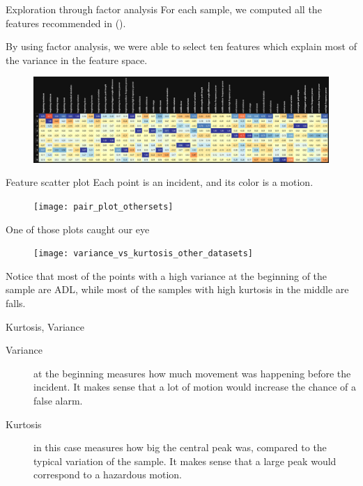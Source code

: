 \documentclass{beamer}
\begin{document}
\begin{frame}{Exploration through factor analysis}
For each sample, we computed all the features recommended in (\cite{vseketa2021event}).

By using factor analysis, we were able to select ten features which explain most of the variance in the feature space.

\begin{figure}[h!]
\includegraphics[width=\textwidth]{factors}
\end{figure}
\end{frame}

\begin{frame}{Feature scatter plot}
Each point is an incident, and its color is a motion.
\begin{figure}
\texttt{[image: pair\_plot\_othersets]}
\end{figure}
\end{frame}

\begin{frame}{One of those plots caught our eye}
\begin{figure}
\texttt{[image: variance\_vs\_kurtosis\_other\_datasets]}
\end{figure}
Notice that most of the points with a high variance at the beginning of the sample are ADL, while most of the samples with high kurtosis in the middle are falls.
\end{frame}

\begin{frame}{Kurtosis, Variance}
\begin{description}
\item[Variance] at the beginning measures how much movement was happening before the incident. It makes sense that a lot of motion would increase the chance of a false alarm.
\item[Kurtosis] in this case measures how big the central peak was, compared to the typical variation of the sample. It makes sense that a large peak would correspond to a hazardous motion.
\end{description}
\end{frame}
\end{document}
